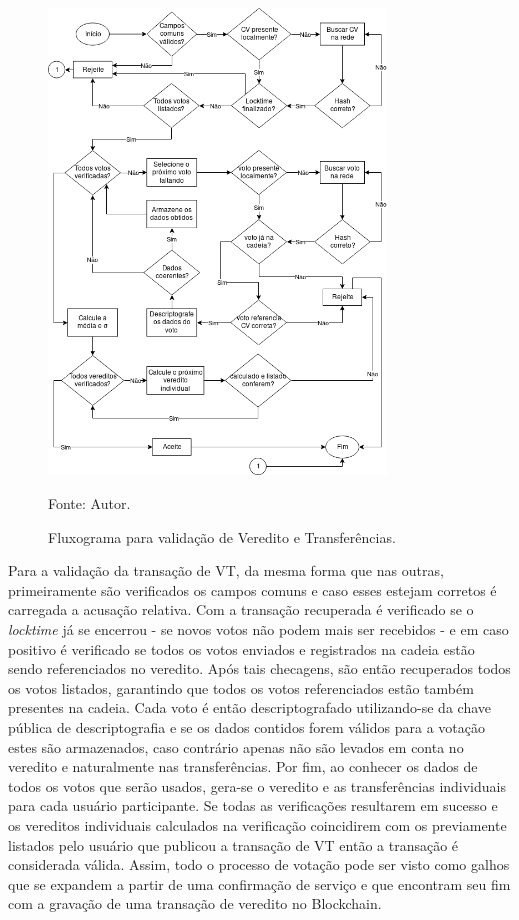\begin{figure}[ht!]
\caption{Fluxograma para validação de Veredito e Transferências.}
\centering
\includegraphics[width=0.8\textwidth]{imagens/validacao_vt.png}
\begin{center}
        Fonte: Autor.
\end{center}
\label{fig:validacao_vt}
\end{figure}

Para a validação da transação de \ac{VT}, da mesma forma que nas outras, primeiramente são verificados os campos comuns e caso esses estejam corretos é carregada a acusação relativa. Com a transação recuperada é verificado se o \textit{locktime} já se encerrou - se novos votos não podem mais ser recebidos - e em caso positivo é verificado se todos os votos enviados e registrados na cadeia estão sendo referenciados no veredito. Após tais checagens, são então recuperados todos os votos listados, garantindo que todos os votos referenciados estão também presentes na cadeia. Cada voto é então descriptografado utilizando-se da chave pública de descriptografia e se os dados contidos forem válidos para a votação estes são armazenados, caso contrário apenas não são levados em conta no veredito e naturalmente nas transferências. Por fim, ao conhecer os dados de todos os votos que serão usados, gera-se o veredito e as transferências individuais para cada usuário participante. Se todas as verificações resultarem em sucesso e os vereditos individuais calculados na verificação coincidirem com os previamente listados pelo usuário que publicou a transação de \ac{VT} então a transação é considerada válida.
%
Assim, todo o processo de votação pode ser visto como galhos que se expandem a partir de uma confirmação de serviço e que encontram seu fim com a gravação de uma transação de veredito no Blockchain.

